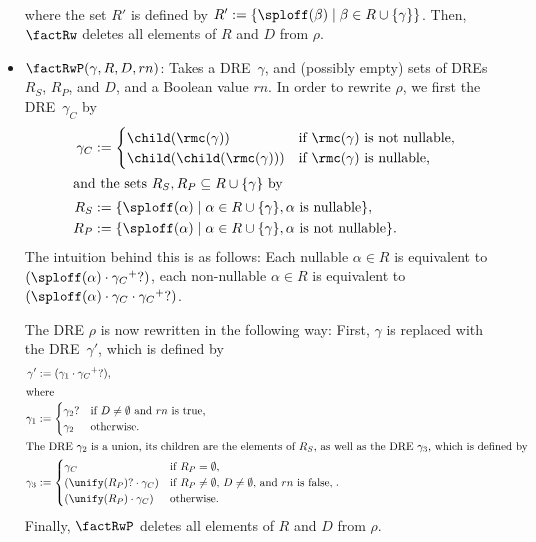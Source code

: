 \documentclass[a4paper,11pt, svgnames,titlepage]{article}
\newcommand{\rxp}{{^\mathtt{+}}}
\newcommand{\rxo}{\mathtt{?}}
\newcommand{\rxc}{\cdot}
\newcommand{\df}{:=}
\begin{document}
\begin{itemize}
\begin{align*}
\end{align*}
where the set $R'$ is defined by $R'\df\{\sploff(\beta)\mid \beta\in R\cup\{\gamma\}\}$. Then, $\factRw$ deletes all elements of $R$ and $D$ from $\rho$.
\item $\factRwP(\gamma,R,D,rn)$: Takes a DRE~$\gamma$, and (possibly empty) sets of DREs $R_S$, $R_P$, and $D$, and a Boolean value $rn$. In order to rewrite $\rho$, we first the DRE~$\gamma_{C}$ by
\begin{align*}
	\gamma_{C}&\df \begin{cases}
		\child(\rmc(\gamma)) & \text{if $\rmc(\gamma)$ is not nullable,}\\ 
		\child(\child(\rmc(\gamma))) & \text{if $\rmc(\gamma)$ is nullable,} 
	\end{cases}\\
\intertext{and the sets $R_S, R_P\subseteq R\cup\{\gamma\}$ by}
	R_S&\df\{\sploff(\alpha)\mid\alpha\in R\cup\{\gamma\}, \alpha\text{ is nullable}\},\\
	R_P&\df\{\sploff(\alpha)\mid\alpha\in R\cup\{\gamma\}, \alpha\text{ is not nullable}\}.
\end{align*}
The intuition behind this is as follows: Each nullable $\alpha\in R$ is equivalent to $(\sploff(\alpha)\rxc \gamma_{C}\rxp\rxo)$, each non-nullable $\alpha\in R$ is equivalent to $(\sploff(\alpha)\rxc \gamma_{C}\rxc\gamma_{C}\rxp\rxo)$.

The DRE $\rho$ is now rewritten in the following way: First, $\gamma$ is replaced with the DRE~$\gamma'$, which is defined by
\begin{align*}
	\gamma'&\df (\gamma_1\rxc\gamma_{C}\rxp\rxo),\\
	\shortintertext{where}	
	\gamma_1&\df \begin{cases}
		\gamma_2\rxo &  \text{if $D\neq \emptyset$ and $rn$ is true,}\\
		\gamma_2 & \text{otherwise.}
	\end{cases}\\
	\shortintertext{The DRE~$\gamma_2$ is a union, its children are the elements of $R_S$, as well as the DRE~$\gamma_3$, which is defined by}
	\gamma_3&\df \begin{cases}
		\gamma_{C} & \text{if $R_P=\emptyset$},\\
		(\unify(R_{P})\rxo\rxc\gamma_{C})&\text{if $R_P\neq \emptyset$, $D\neq\emptyset$, and $rn$ is false},\\
		(\unify(R_{P})\rxc\gamma_{C})&\text{otherwise}.
	\end{cases}.
\end{align*}
Finally, $\factRwP$ deletes all elements of $R$ and $D$ from $\rho$.
\end{itemize}
\end{document}
